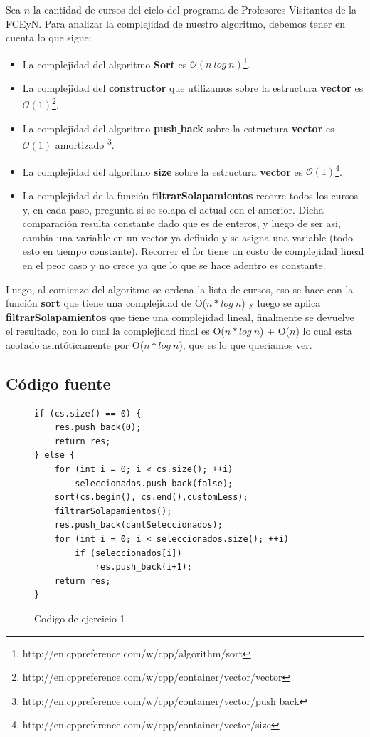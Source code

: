 Sea $n$ la cantidad de cursos del ciclo del programa de Profesores Visitantes de la FCEyN. Para analizar la complejidad de nuestro algoritmo, debemos tener en cuenta lo que sigue:
\begin{itemize}
\item La complejidad del algoritmo \textbf{Sort} es $\mathcal{O}(n\ log\ n)$\footnote{http://en.cppreference.com/w/cpp/algorithm/sort}.
\item La complejidad del \textbf{constructor} que utilizamos sobre la estructura \textbf{vector} es $\mathcal{O}(1)$\footnote{http://en.cppreference.com/w/cpp/container/vector/vector}.
\item La complejidad del algoritmo \textbf{push$\_$back} sobre la estructura \textbf{vector} es $\mathcal{O}(1)$ amortizado \footnote{http://en.cppreference.com/w/cpp/container/vector/push$\_$back}. 
\item La complejidad del algoritmo \textbf{size} sobre la estructura \textbf{vector} es $\mathcal{O}(1)$\footnote{http://en.cppreference.com/w/cpp/container/vector/size}.
\item La complejidad de la función \textbf{filtrarSolapamientos} recorre todos los cursos y, en cada paso, pregunta si se solapa el actual con el anterior. Dicha comparación resulta constante dado que es de enteros, y luego de ser asi, cambia una variable en un vector ya definido y se asigna una variable (todo esto en tiempo constante). Recorrer el for tiene un costo de complejidad lineal en el peor caso y no crece ya que lo que se hace adentro es constante.
\end{itemize}

Luego, al comienzo del algoritmo se ordena la lista de cursos, eso se hace con la función \textbf{sort} que tiene una complejidad de O($n*log\ n$) y luego se aplica \textbf{filtrarSolapamientos} que tiene una complejidad lineal, finalmente se devuelve el resultado, con lo cual la complejidad final es O($n*log\ n$) + O($n$) lo cual esta acotado asintóticamente por O($n*log\ n$), que es lo que queriamos ver.

\subsection{Código fuente}

\begin{figure}[H]
\begin{center}
\begin{verbatim}
if (cs.size() == 0) {
    res.push_back(0);
    return res;
} else {
    for (int i = 0; i < cs.size(); ++i)
        seleccionados.push_back(false);
    sort(cs.begin(), cs.end(),customLess);
    filtrarSolapamientos();
    res.push_back(cantSeleccionados);
    for (int i = 0; i < seleccionados.size(); ++i)
        if (seleccionados[i])
            res.push_back(i+1);
    return res;
}
\end{verbatim}
\caption{Codigo de ejercicio 1}
\end{center}
\end{figure}

